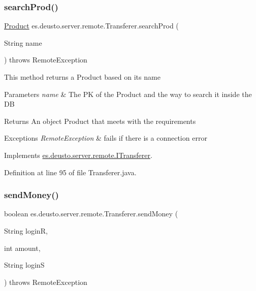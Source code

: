 \subsubsection{\texorpdfstring{search\+Prod()}{searchProd()}}
{\footnotesize\ttfamily \hyperlink{classes_1_1deusto_1_1server_1_1db_1_1data_1_1_product}{Product} es.\+deusto.\+server.\+remote.\+Transferer.\+search\+Prod (\begin{DoxyParamCaption}\item[{String}]{name }\end{DoxyParamCaption}) throws Remote\+Exception}

This method returns a Product based on its name 
\begin{DoxyParams}{Parameters}
{\em name} & The PK of the Product and the way to search it inside the DB \\
\hline
\end{DoxyParams}
\begin{DoxyReturn}{Returns}
An object Product that meets with the requirements 
\end{DoxyReturn}

\begin{DoxyExceptions}{Exceptions}
{\em Remote\+Exception} & fails if there is a connection error \\
\hline
\end{DoxyExceptions}


Implements \hyperlink{interfacees_1_1deusto_1_1server_1_1remote_1_1_i_transferer_a1fb33a5447e1647ffde8a01d180b8d99}{es.\+deusto.\+server.\+remote.\+I\+Transferer}.



Definition at line 95 of file Transferer.\+java.

\mbox{\label{classes_1_1deusto_1_1server_1_1remote_1_1_transferer_ad1eb84155ba0c457645f2ad53725320d}} 
\subsubsection{\texorpdfstring{send\+Money()}{sendMoney()}}
{\footnotesize\ttfamily boolean es.\+deusto.\+server.\+remote.\+Transferer.\+send\+Money (\begin{DoxyParamCaption}\item[{String}]{loginR,  }\item[{int}]{amount,  }\item[{String}]{loginS }\end{DoxyParamCaption}) throws Remote\+Exception}

